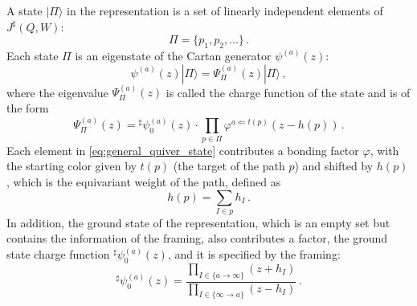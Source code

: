 \documentclass[12pt,a4paper]{article}
\renewcommand{\(}{\left(}
\renewcommand{\)}{\right)}
\renewcommand{\(}{\left(}
\renewcommand{\)}{\right)}
\begin{document}
A state $|\Pi\rangle$ in the representation is a set of linearly independent elements of $J^\sharp(Q,W)$:
\begin{equation}\label{eq:general_quiver_state}
	\Pi=\{p_1,p_2,\dots\}\,.
\end{equation}
Each state $\Pi$ is an eigenstate of the Cartan generator $\psi^{(a)}(z)$:
\begin{equation}
	\psi^{(a)}(z)|\Pi\rangle=\Psi_{\Pi}^{(a)}(z) |\Pi\rangle\,,
\end{equation}
where the eigenvalue $\Psi_{\Pi}^{(a)}(z)$ is called the charge function of the state and is of the form
\begin{equation}\label{eq:QY_charge_function}
	\Psi_{\Pi}^{(a)}(z)={}^\sharp\psi^{(a)}_0(z)\cdot\prod_{p\in \Pi}\varphi^{a\Leftarrow t(p)}(z-h(p))\,.
\end{equation}
Each element in \eqref{eq:general_quiver_state} contributes a bonding factor $\varphi$, with the starting color given by $t(p)$ (the target of the path $p$) and shifted by $h(p)$, which is the equivariant weight of the path, defined as
\begin{equation}
	h(p)=\sum_{I\in p}h_I\,.
\end{equation}
In addition, the ground state of the representation, which is an empty set but contains the information of the framing, also contributes a factor, the ground state charge function ${}^\sharp\psi^{(a)}_0(z)$, and it is specified by the framing:
\begin{equation}\label{eq:ground_charge}
	{}^\sharp\psi^{(a)}_0(z)=\frac{\prod_{I\in\{a\to\infty\}}(z+h_I)}{\prod_{I\in\{\infty\to a\}}(z-h_I)}\,.
\end{equation}
\end{document}
